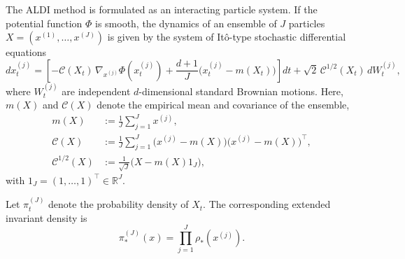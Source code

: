 \documentclass[a4paper]{article}
\numberwithin{equation}{section}
\begin{document}
The ALDI method is formulated as an interacting particle system.  
If the potential function \(\Phi\) is smooth, the dynamics of an ensemble of \(J\) particles \(X=(x^{(1)},\ldots,x^{(J)})\) is given by the system of Itô-type stochastic differential equations
\begin{equation}
    \label{eq:ALDI_smooth}
    dx_t^{(j)} 
    = \left[-\mathcal{C}(X_t)\,\nabla_{x^{(j)}} \Phi\!\left(x_t^{(j)}\right)
    + \frac{d+1}{J}\big(x_t^{(j)} - m(X_t)\big)\right] dt
    + \sqrt{2}\,\mathcal{C}^{1/2}(X_t)\,dW_t^{(j)},
\end{equation}
where \(W_t^{(j)}\) are independent \(d\)-dimensional standard Brownian motions.  
Here, \(m(X)\) and \(\mathcal{C}(X)\) denote the empirical mean and covariance of the ensemble,
\begin{equation}
    \label{eq:ALDI_definitions}
    \begin{split}
        m(X) &:= \frac{1}{J}\sum_{j=1}^J x^{(j)}, \\[2mm]
        \mathcal{C}(X) &:= \frac{1}{J}\sum_{j=1}^J \big(x^{(j)}-m(X)\big)\big(x^{(j)}-m(X)\big)^\top, \\[2mm]
        \mathcal{C}^{1/2}(X) &:= \frac{1}{\sqrt{J}}\big(X - m(X)1_J\big),
    \end{split}
\end{equation}
with \(1_J=(1,\ldots,1)^\top \in \mathbb{R}^J\).

Let \(\pi_t^{(J)}\) denote the probability density of \(X_t\).  
The corresponding extended invariant density is
\begin{equation}
    \label{eq:invariant_density}
    \pi_*^{(J)}(x) = \prod_{j=1}^J \rho_*\!\left(x^{(j)}\right).
\end{equation}
\end{document}
